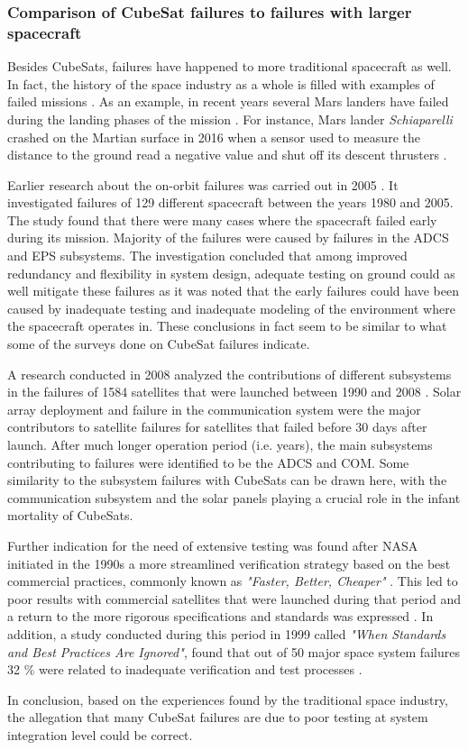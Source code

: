 \documentclass[english,12pt,a4paper,pdftex,elec,utf8]{aaltothesis}
\begin{document}
\subsubsection{Comparison of CubeSat failures to failures with larger spacecraft}
Besides CubeSats, failures have happened to more traditional spacecraft as well. In fact, the history of the space industry as a whole is filled with examples of failed missions \cite{failureshistory}. As an example, in recent years several Mars landers have failed during the landing phases of the mission \cite{marsfailures}. For instance, Mars lander \textit{Schiaparelli} crashed on the Martian surface in 2016 when a sensor used to measure the distance to the ground read a negative value and shut off its descent thrusters \cite{schiaparelli}.\par
Earlier research about the on-orbit failures was carried out in 2005 \cite{onorbitfailures}. It investigated failures of 129 different spacecraft between the years 1980 and 2005. The study found that there were many cases where the spacecraft failed early during its mission. Majority of the failures were caused by failures in the ADCS and EPS subsystems. The investigation concluded that among improved redundancy and flexibility in system design, adequate testing on ground could as well mitigate these failures as it was noted that the early failures could have been caused by inadequate testing and inadequate modeling of the environment where the spacecraft operates in. These conclusions in fact seem to be similar to what some of the surveys done on CubeSat failures indicate. \cite{onorbitfailures} \par
A research conducted in 2008 analyzed the contributions of different subsystems in the failures of 1584 satellites that were launched between 1990 and 2008 \cite{satsubsystems}. Solar array deployment and failure in the communication system were the major contributors to satellite failures for satellites that failed before 30 days after launch. After much longer operation period (i.e. years), the main subsystems contributing to failures were identified to be the ADCS and COM. Some similarity to the subsystem failures with CubeSats can be drawn here, with the communication subsystem and the solar panels playing a crucial role in the infant mortality of CubeSats.\par 
Further indication for the need of extensive testing was found after NASA initiated in the 1990s a more streamlined verification strategy based on the best commercial practices, commonly known as \textit{"Faster, Better, Cheaper"} \cite{satverplanning}. This led to poor results with commercial satellites that were launched during that period and a return to the more rigorous specifications and standards was expressed \cite{satverplanning}. In addition, a study conducted during this period in 1999 called \textit{"When Standards and Best Practices Are Ignored"}, found that out of 50 major space system failures 32 \% were related to inadequate verification and test processes \cite{whenstandignored}.\par 
In conclusion, based on the experiences found by the traditional space industry, the allegation that many CubeSat failures are due to poor testing at system integration level could be correct.\par 
\end{document}

